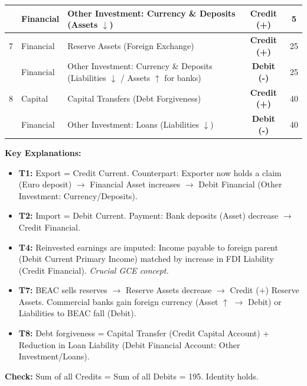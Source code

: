 \documentclass[11pt]{article}
\begin{document}
\begin{exoresolu}
\begin{center}
\begin{tabularx}{\linewidth}{|c|X|X|c|c|}
  & Financial & Other Investment: Currency \& Deposits (Assets $\downarrow$) & \textbf{Credit (+)} & 5 \\ \hline
7 & Financial & Reserve Assets (Foreign Exchange) & \textbf{Credit (+)} & 25 \\
  & Financial & Other Investment: Currency \& Deposits (Liabilities $\downarrow$ / Assets $\uparrow$ for banks) & \textbf{Debit (-)} & 25 \\ \hline
8 & Capital & Capital Transfers (Debt Forgiveness) & \textbf{Credit (+)} & 40 \\
  & Financial & Other Investment: Loans (Liabilities $\downarrow$) & \textbf{Debit (-)} & 40 \\ \hline
\end{tabularx}
\end{center}

\textbf{Key Explanations:}
\begin{itemize}
    \item \textbf{T1:} Export = Credit Current. Counterpart: Exporter now holds a claim (Euro deposit) $\rightarrow$ Financial Asset increases $\rightarrow$ Debit Financial (Other Investment: Currency/Deposits).
    \item \textbf{T2:} Import = Debit Current. Payment: Bank deposits (Asset) decrease $\rightarrow$ Credit Financial.
    \item \textbf{T4:} Reinvested earnings are imputed: Income payable to foreign parent (Debit Current Primary Income) matched by increase in FDI Liability (Credit Financial). \textit{Crucial GCE concept.}
    \item \textbf{T7:} BEAC sells reserves $\rightarrow$ Reserve Assets decrease $\rightarrow$ Credit (+) Reserve Assets. Commercial banks gain foreign currency (Asset $\uparrow$ $\rightarrow$ Debit) or Liabilities to BEAC fall (Debit).
    \item \textbf{T8:} Debt forgiveness = Capital Transfer (Credit Capital Account) + Reduction in Loan Liability (Debit Financial Account: Other Investment/Loans).
\end{itemize}
\textbf{Check:} Sum of all Credits = Sum of all Debits = 195. Identity holds.
\end{exoresolu}
\end{document}

